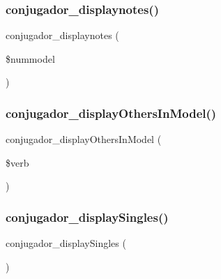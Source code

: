 \subsubsection{\texorpdfstring{conjugador\+\_\+displaynotes()}{conjugador\_displaynotes()}}
{\footnotesize\ttfamily conjugador\+\_\+displaynotes (\begin{DoxyParamCaption}\item[{}]{\$nummodel }\end{DoxyParamCaption})}

\hypertarget{php_2conjoc__web_form_8inc_a64885b968e081840d6a10adc2a38db9e}{}\label{php_2conjoc__web_form_8inc_a64885b968e081840d6a10adc2a38db9e} 
\subsubsection{\texorpdfstring{conjugador\+\_\+display\+Others\+In\+Model()}{conjugador\_displayOthersInModel()}}
{\footnotesize\ttfamily conjugador\+\_\+display\+Others\+In\+Model (\begin{DoxyParamCaption}\item[{}]{\$verb }\end{DoxyParamCaption})}

\hypertarget{php_2conjoc__web_form_8inc_ac41ee7cf6ccd6dd46de8112c7c315cfe}{}\label{php_2conjoc__web_form_8inc_ac41ee7cf6ccd6dd46de8112c7c315cfe} 
\subsubsection{\texorpdfstring{conjugador\+\_\+display\+Singles()}{conjugador\_displaySingles()}}
{\footnotesize\ttfamily conjugador\+\_\+display\+Singles (\begin{DoxyParamCaption}{ }\end{DoxyParamCaption})}

\hypertarget{php_2conjoc__web_form_8inc_adfb69460570fdffecec436447f5ed729}{}\label{php_2conjoc__web_form_8inc_adfb69460570fdffecec436447f5ed729} 
